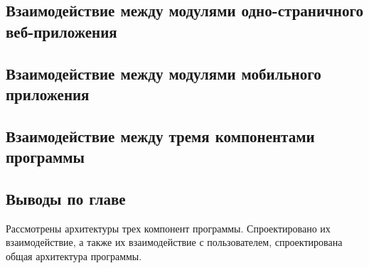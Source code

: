 \newpage
\subsection{Взаимодействие между модулями одно-страничного веб-приложения}



\newpage
\subsection{Взаимодействие между модулями мобильного приложения}







\newpage
\subsection{Взаимодействие между тремя компонентами программы}







\newpage
\subsection{Выводы по главе}
Рассмотрены архитектуры трех компонент программы. Спроектировано их взаимодействие, а также их взаимодействие с пользователем, спроектирована общая архитектура программы.

